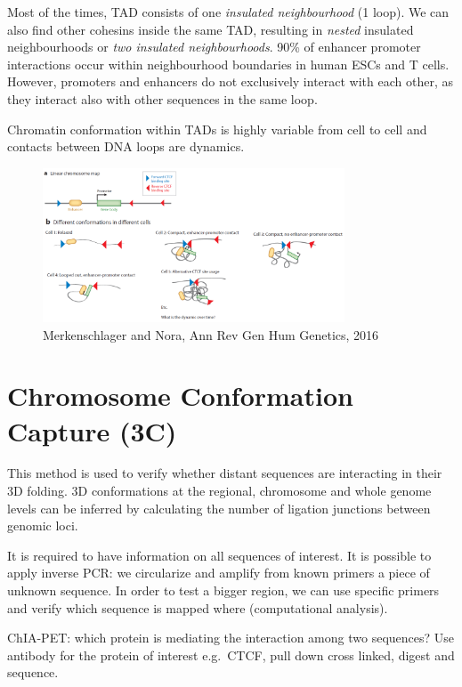 Most of the times, TAD consists of one \emph{insulated neighbourhood} (1 loop). We can also find other cohesins inside the same TAD, resulting in \emph{nested} insulated neighbourhoods or \emph{two insulated neighbourhoods}. 90\% of enhancer promoter interactions occur within neighbourhood boundaries in human ESCs and T cells. However, promoters and enhancers do not exclusively interact with each other, as they interact also with other sequences in the same loop.

Chromatin conformation within TADs is highly variable from cell to cell and contacts between DNA loops are dynamics.

\begin{figure}
\centering
\includegraphics[width=0.8\textwidth]{../_resources/Screenshot_2022-10-19_at_08-48-41.png}
\caption{Merkenschlager and Nora, Ann Rev Gen Hum Genetics, 2016}
\end{figure}

\hypertarget{chromosome-conformation-capture-3c}{%
\section{Chromosome Conformation Capture (3C)}\label{chromosome-conformation-capture-3c}}

This method is used to verify whether distant sequences are interacting in their 3D folding. 3D conformations at the regional, chromosome and whole genome levels can be inferred by calculating the number of ligation junctions between genomic loci.

It is required to have information on all sequences of interest. It is possible to apply inverse PCR: we circularize and amplify from known primers a piece of unknown sequence. In order to test a bigger region, we can use specific primers and verify which sequence is mapped where (computational analysis).

ChIA-PET: which protein is mediating the interaction among two sequences? Use antibody for the protein of interest e.g.~CTCF, pull down cross linked, digest and sequence.

